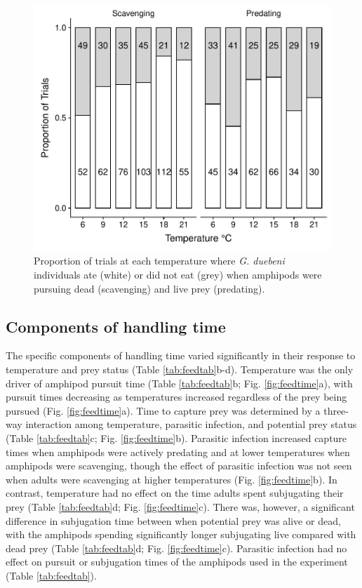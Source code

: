 \begin{figure}[H]
    \centering
    \includegraphics[scale=0.7]{figures/ch4/propeat.pdf}
  \caption [Proportion of \emph{G. duebeni} eating across a range of temperatures when prey were mobile or sessile]{Proportion of trials at each temperature where \emph{G. duebeni} individuals ate (white) or did not eat (grey) when amphipods were pursuing dead (scavenging) and live prey (predating).} 
    \label{fig:propeat}
\end{figure}

\subsection{Components of handling time}

The specific components of handling time varied significantly in their response to temperature and prey status (Table \ref{tab:feedtab}b-d). Temperature was the only driver of amphipod pursuit time (Table \ref{tab:feedtab}b; Fig. \ref{fig:feedtime}a), with pursuit times decreasing as temperatures increased regardless of the prey being pursued (Fig. \ref{fig:feedtime}a). Time to capture prey was determined by a three-way interaction among temperature, parasitic infection, and potential prey status (Table \ref{tab:feedtab}c; Fig. \ref{fig:feedtime}b). Parasitic infection increased capture times when amphipods were actively predating and at lower temperatures when amphipods were scavenging, though the effect of parasitic infection was not seen when adults were scavenging at higher temperatures (Fig. \ref{fig:feedtime}b). In contrast, temperature had no effect on the time adults spent subjugating their prey (Table \ref{tab:feedtab}d; Fig. \ref{fig:feedtime}c). There was, however, a significant difference in subjugation time between when potential prey was alive or dead, with the amphipods spending significantly longer subjugating live compared with dead prey (Table \ref{tab:feedtab}d; Fig. \ref{fig:feedtime}c). Parasitic infection had no effect on pursuit or subjugation times of the amphipods used in the experiment (Table \ref{tab:feedtab}).

